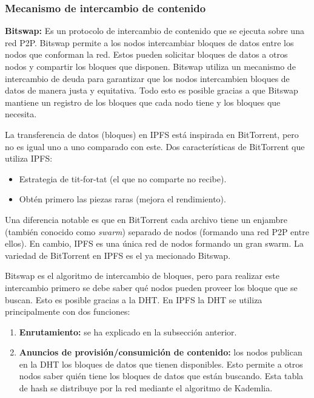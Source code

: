 \subsubsection{Mecanismo de intercambio de contenido}

\textbf{Bitswap:} Es un protocolo de intercambio de contenido que se ejecuta sobre una red P2P. Bitswap permite a los nodos intercambiar bloques de datos entre los nodos que conforman la red. Estos pueden solicitar bloques de datos a otros nodos y compartir los bloques que disponen. Bitswap utiliza un mecanismo de intercambio de deuda para
garantizar que los nodos intercambien bloques de datos de manera justa y equitativa.
Todo esto es posible gracias a que Bitswap mantiene un registro de los bloques que cada nodo tiene y los bloques que necesita.

La transferencia de datos (bloques) en IPFS está inspirada en BitTorrent, pero no es igual uno a uno comparado con este. Dos características de BitTorrent que utiliza IPFS:
\begin{itemize}[itemsep=1pt,nolistsep]
      \item Estrategia de tit-for-tat (el que no comparte no recibe).
      \item Obtén primero las piezas raras (mejora el rendimiento).
\end{itemize}
Una diferencia notable es que en BitTorrent cada archivo tiene un enjambre (también conocido como \textit{swarm}) separado de nodos (formando una red P2P entre ellos). En cambio, IPFS es una única red de nodos formando un gran swarm. La variedad de BitTorrent en IPFS es el ya mecionado Bitswap.

Bitswap es el algoritmo de intercambio de bloques, pero para realizar este intercambio primero se debe saber qué nodos pueden proveer los bloque que se buscan.
Esto es posible gracias a la DHT. En IPFS la DHT se utiliza principalmente con dos funciones:
\begin{enumerate}
      \item \textbf{Enrutamiento:} se ha explicado en la subsección anterior.
      \item \textbf{Anuncios de provisión/consumición de contenido:} los nodos publican en la DHT los bloques de datos que tienen disponibles. Esto permite a otros nodos saber quién tiene los bloques de datos que están buscando. Esta tabla de hash se distribuye por la red mediante el algoritmo de Kademlia.
\end{enumerate}

